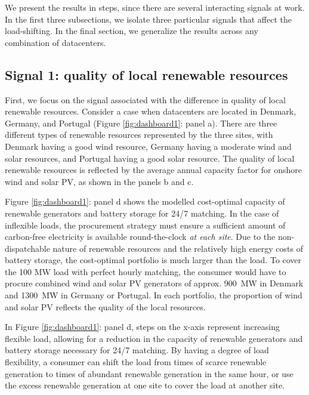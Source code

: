 %

We present the results in steps, since there are several interacting signals at work. In the first three subsections, we isolate three particular signals that affect the load-shifting. In the final section, we generalize the results across any combination of datacenters.

\subsection{Signal 1: quality of local renewable resources}

First, we focus on the signal associated with the difference in quality of local renewable resources. Consider a case when datacenters are located in Denmark, Germany, and Portugal (Figure \ref{fig:dashboard1}: panel a). There are three different types of renewable resources represented by the three sites, with Denmark having a good wind resource, Germany having a moderate wind and solar resources, and Portugal having a good solar resource. The quality of local renewable resources is reflected by the average annual capacity factor for onshore wind and solar PV, as shown in the panels b and c.

Figure \ref{fig:dashboard1}: panel d shows the modelled cost-optimal capacity of renewable generators and battery storage for 24/7 matching. In the case of inflexible loads, the procurement strategy must ensure a sufficient amount of carbon-free electricity is available round-the-clock \textit{at each site}. Due to the non-dispatchable nature of renewable resources and the relatively high energy costs of battery storage, the cost-optimal portfolio is much larger than the load. To cover the 100 MW load with perfect hourly matching, the consumer would have to procure combined wind and solar PV generators of approx. 900~MW in Denmark and 1300~MW in Germany or Portugal. In each portfolio, the proportion of wind and solar PV reflects the quality of the local resources.

In Figure \ref{fig:dashboard1}: panel d, steps on the x-axis represent increasing flexible load, allowing for a reduction in the capacity of renewable generators and battery storage necessary for 24/7 matching. By having a degree of load flexibility, a consumer can shift the load from times of scarce renewable generation to times of abundant renewable generation in the same hour, or use the excess renewable generation at one site to cover the load at another site.

